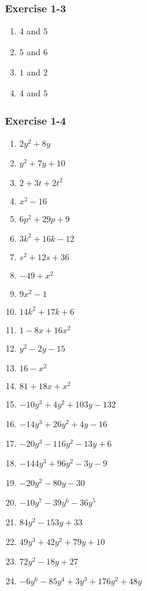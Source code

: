 {\begin{multicols}{3}
\subsubsection*{Exercise 1-3} %

\begin{enumerate}[noitemsep, label=\textbf{\arabic*}. ]
\item $4$ and $5$%
\item $5$ and $6$%
\item $1$ and $2$%
\item $4$ and $5$%

\end{enumerate}


\subsubsection*{Exercise 1-4} %



\begin{enumerate}[label=\textbf{\arabic*}., noitemsep]
\item $2y^2 + 8y$%
\item $y^2 + 7y + 10$%
\item $2 + 3t +2t^2$%
\item $x^2 - 16$%
\item $6p^2 + 29p + 9$%
\item $3k^2 +16k - 12$%
\item $s^2 + 12s +36$%
\item $-49 + x^2$%
\item $9x^2 - 1$%
\item $14k^2 + 17k + 6$%
\item $1 -8x + 16x^2$%
\item $y^2 - 2y - 15$%
\item $16 - x^2$%
\item $81 + 18x + x^2$%
\item $-10y^3 + 4y^2 + 103y - 132$%
\item $-14y^3 + 26y^2 + 4y -16$ %
\item $-20y^3 -116y^2 -13y +6$%
\item $-144y^3 + 96y^2 -3y -9$%
\item $-20y^2 - 80y - 30$%
\item $-10y^7 - 39y^6 - 36y^5$%
\item $84y^2 - 153y +33$%
\item $49y^3 + 42y^2 + 79y + 10$%
\item $72y^2 - 18y + 27$%
\item $-6y^6 - 85y^4 + 3y^3 + 176y^2 + 48y$%
\end{enumerate}



\end{multicols}}

